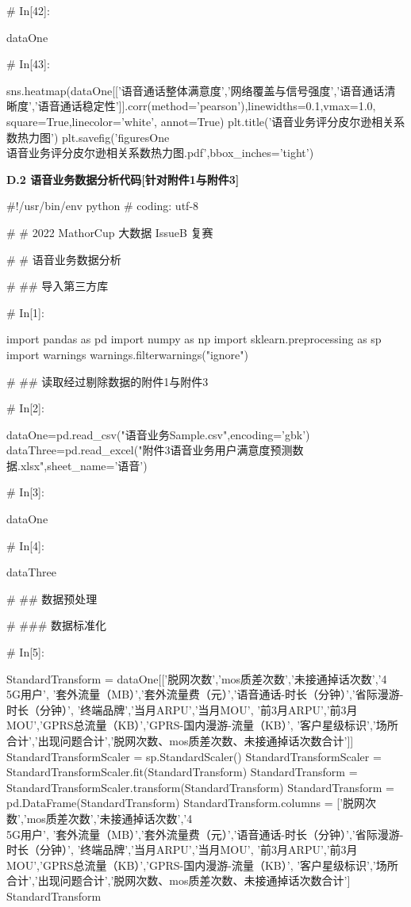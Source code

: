 \documentclass{MathorCupmodeling}
\begin{document}
\begin{python}
# In[42]:


dataOne


# In[43]:


sns.heatmap(dataOne[['语音通话整体满意度','网络覆盖与信号强度','语音通话清晰度','语音通话稳定性']].corr(method='pearson'),linewidths=0.1,vmax=1.0, square=True,linecolor='white', annot=True)
plt.title('语音业务评分皮尔逊相关系数热力图')
plt.savefig('figuresOne\\[附件1]语音业务评分皮尔逊相关系数热力图.pdf',bbox_inches='tight')

\end{python}
\newpage
\textbf{D.2 语音业务数据分析代码[针对附件1与附件3]}
\begin{python}
#!/usr/bin/env python
# coding: utf-8

# # 2022 MathorCup 大数据 IssueB 复赛

# # 语音业务数据分析

# ## 导入第三方库

# In[1]:


import pandas as pd
import numpy as np
import sklearn.preprocessing as sp
import warnings
warnings.filterwarnings("ignore")


# ## 读取经过剔除数据的附件1与附件3

# In[2]:


dataOne=pd.read_csv("语音业务Sample.csv",encoding='gbk')
dataThree=pd.read_excel("附件3语音业务用户满意度预测数据.xlsx",sheet_name='语音')


# In[3]:


dataOne


# In[4]:


dataThree


# ## 数据预处理

# ### 数据标准化

# In[5]:


StandardTransform = dataOne[['脱网次数','mos质差次数','未接通掉话次数','4\\5G用户', '套外流量（MB）','套外流量费（元）','语音通话-时长（分钟）','省际漫游-时长（分钟）', '终端品牌','当月ARPU','当月MOU', '前3月ARPU','前3月MOU','GPRS总流量（KB）','GPRS-国内漫游-流量（KB）', '客户星级标识','场所合计','出现问题合计','脱网次数、mos质差次数、未接通掉话次数合计']]
StandardTransformScaler = sp.StandardScaler()
StandardTransformScaler = StandardTransformScaler.fit(StandardTransform)
StandardTransform = StandardTransformScaler.transform(StandardTransform)
StandardTransform = pd.DataFrame(StandardTransform)
StandardTransform.columns = ['脱网次数','mos质差次数','未接通掉话次数','4\\5G用户', '套外流量（MB）','套外流量费（元）','语音通话-时长（分钟）','省际漫游-时长（分钟）', '终端品牌','当月ARPU','当月MOU', '前3月ARPU','前3月MOU','GPRS总流量（KB）','GPRS-国内漫游-流量（KB）', '客户星级标识','场所合计','出现问题合计','脱网次数、mos质差次数、未接通掉话次数合计']
StandardTransform



\end{python}
\end{document}
